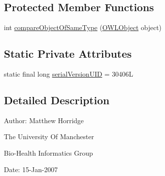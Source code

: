 \subsection*{Protected Member Functions}
\begin{DoxyCompactItemize}
\item 
int \hyperlink{classuk_1_1ac_1_1manchester_1_1cs_1_1owl_1_1owlapi_1_1_s_w_r_l_class_atom_impl_af0d697458a517818df1f16aee29bd210}{compare\-Object\-Of\-Same\-Type} (\hyperlink{interfaceorg_1_1semanticweb_1_1owlapi_1_1model_1_1_o_w_l_object}{O\-W\-L\-Object} object)
\end{DoxyCompactItemize}
\subsection*{Static Private Attributes}
\begin{DoxyCompactItemize}
\item 
static final long \hyperlink{classuk_1_1ac_1_1manchester_1_1cs_1_1owl_1_1owlapi_1_1_s_w_r_l_class_atom_impl_ad90d468e8c01a88d1448eeb1f4eacbe6}{serial\-Version\-U\-I\-D} = 30406\-L
\end{DoxyCompactItemize}


\subsection{Detailed Description}
Author\-: Matthew Horridge\par
 The University Of Manchester\par
 Bio-\/\-Health Informatics Group\par
 Date\-: 15-\/\-Jan-\/2007\par
\par
 

